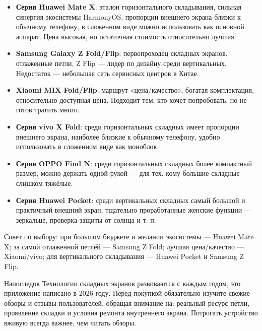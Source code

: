 \begin{itemize}
  \item \textbf{Серия Huawei Mate X}: эталон горизонтального складывания, сильная синергия экосистемы HarmonyOS, пропорции внешнего экрана близки к обычному телефону, в сложенном виде можно использовать как основной аппарат. Цена высокая, но остаточная стоимость относительно лучшая.
  \item \textbf{Samsung Galaxy Z Fold/Flip}: первопроходец складных экранов, отлаженные петли, Z Flip — лидер по дизайну среди вертикальных. Недостаток — небольшая сеть сервисных центров в Китае.
  \item \textbf{Xiaomi MIX Fold/Flip}: маршрут «цена/качество», богатая комплектация, относительно доступная цена. Подходит тем, кто хочет попробовать, но не готов тратить много.
  \item \textbf{Серия vivo X Fold}: среди горизонтальных складных имеет пропорции внешнего экрана, наиболее близкие к обычному телефону, удобно использовать в сложенном виде как моноблок.
  \item \textbf{Серия OPPO Find N}: среди горизонтальных складных более компактный размер, можно держать одной рукой — для тех, кому большие складные слишком тяжёлые.
  \item \textbf{Серия Huawei Pocket}: среди вертикальных складных самый большой и практичный внешний экран, тщательно проработанные женские функции — зеркальце, проверка защиты от солнца и т. п.
\end{itemize}

Совет по выбору: при большом бюджете и желании экосистемы — Huawei Mate X; за самой отлаженной петлёй — Samsung Z Fold; лучшая цена/качество — Xiaomi/vivo; для вертикального складывания — Huawei Pocket и Samsung Z Flip.

\begin{tcbinfo}{Напоследок}
Технологии складных экранов развиваются с каждым годом, это приложение написано в 2026 году. Перед покупкой обязательно изучите свежие обзоры и отзывы пользователей, обращая внимание на: реальный ресурс петли, проявление складки и условия ремонта внутреннего экрана. Потрогать устройство вживую всегда важнее, чем читать обзоры.

\end{tcbinfo}
